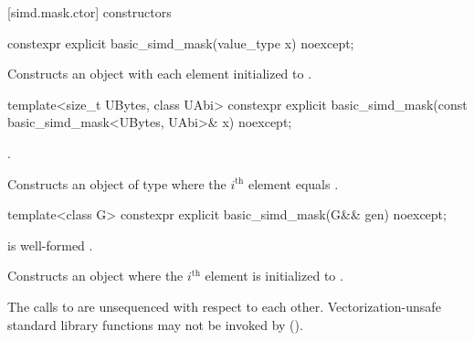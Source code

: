 [simd.mask.ctor]{ constructors}

\begin{itemdecl}
constexpr explicit basic_simd_mask(value_type x) noexcept;
\end{itemdecl}

\begin{itemdescr}
  \pnum\effects
  Constructs an object with each element initialized to .
\end{itemdescr}

\begin{itemdecl}
template<size_t UBytes, class UAbi>
  constexpr explicit basic_simd_mask(const basic_simd_mask<UBytes, UAbi>& x) noexcept;
\end{itemdecl}

\begin{itemdescr}
  \pnum\constraints
  .

  \pnum\effects
  Constructs an object of type  where the $i^\text{th}$ element equals  \foralli.
\end{itemdescr}

\begin{itemdecl}
template<class G> constexpr explicit basic_simd_mask(G&& gen) noexcept;
\end{itemdecl}

\begin{itemdescr}
  \pnum\constraints
   is well-formed \foralli.

  \pnum\effects
  Constructs an object where the $i^\text{th}$ element is initialized to .

  \pnum
  The calls to  are unsequenced with respect to each other.
  Vectorization-unsafe standard library functions may not be invoked by  ().
\end{itemdescr}

\newcommand\MaskLoadDescr[2]{
  \pnum\constraints
  \begin{itemize}
    \item \tcode{iter_value_t<It>} is of type \tcode{bool}, and
    \item \tcode{It} satisfies \tcode{contiguous_iterator}.
  \end{itemize}

  \pnum\expects
  \begin{itemize}
    \item #1
    \item \tcode{It} models \tcode{contiguous_iterator}.
    \flagsRequires{basic_simd_mask}{value_type}
  \end{itemize}

  \pnum\effects #2

  \pnum\throws Nothing.
}

